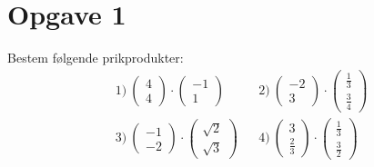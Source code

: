 \section*{Opgave 1}

Bestem følgende prikprodukter:
\begin{align*}
&1) \  \begin{pmatrix} 4\\ 4\end{pmatrix}\cdot \begin{pmatrix} -1\\ 1\end{pmatrix} &&2) \ \begin{pmatrix} -2\\ 3\end{pmatrix}\cdot \begin{pmatrix} \frac{1}{3}\\ \frac{3}{4}\end{pmatrix}   \\
&3) \  \begin{pmatrix} -1\\ -2\end{pmatrix}\cdot \begin{pmatrix} \sqrt{2}\\ \sqrt{3}\end{pmatrix}  &&4) \ \begin{pmatrix} 3\\ \frac{2}{3} \end{pmatrix}\cdot \begin{pmatrix} \frac{1}{3}\\ \frac{3}{2}\end{pmatrix}   \\
\end{align*}

